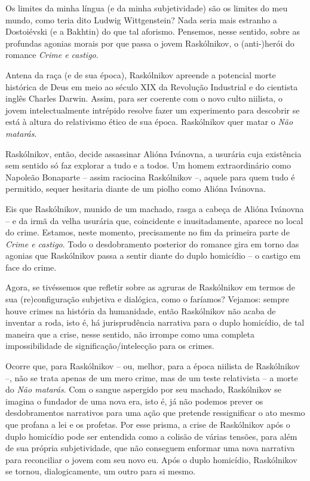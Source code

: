 Os limites da minha língua (e da minha subjetividade) são os limites do
meu mundo, como teria dito Ludwig Wittgenstein? Nada seria mais estranho
a Dostoiévski (e a Bakhtin) do que tal aforismo. Pensemos, nesse
sentido, sobre as profundas agonias morais por que passa o jovem
Raskólnikov, o (anti-)herói do romance \emph{Crime e castigo}.

Antena da raça (e de sua época), Raskólnikov apreende a potencial morte
histórica de Deus em meio ao século XIX da Revolução Industrial e do
cientista inglês Charles Darwin. Assim, para ser coerente com o novo
culto niilista, o jovem intelectualmente intrépido resolve fazer um
experimento para descobrir se está à altura do relativismo ético de sua
época. Raskólnikov quer matar o \emph{Não matarás}.

Raskólnikov, então, decide assassinar Alióna Ivánovna, a usurária cuja
existência sem sentido só faz explorar a tudo e a todos. Um homem
extraordinário como Napoleão Bonaparte -- assim raciocina Raskólnikov
--, aquele para quem tudo é permitido, sequer hesitaria diante de um
piolho como Alióna Ivánovna.

Eis que Raskólnikov, munido de um machado, rasga a cabeça de Alióna
Ivánovna -- e da irmã da velha usurária que, coincidente e
inusitadamente, aparece no local do crime. Estamos, neste momento,
precisamente no fim da primeira parte de \emph{Crime e castigo}. Todo o
desdobramento posterior do romance gira em torno das agonias que
Raskólnikov passa a sentir diante do duplo homicídio -- o castigo em
face do crime.

Agora, se tivéssemos que refletir sobre as agruras de Raskólnikov em
termos de sua (re)configuração subjetiva e dialógica, como o faríamos?
Vejamos: sempre houve crimes na história da humanidade, então
Raskólnikov não acaba de inventar a roda, isto é, há jurisprudência
narrativa para o duplo homicídio, de tal maneira que a crise, nesse
sentido, não irrompe como uma completa impossibilidade de
significação/intelecção para os crimes.

Ocorre que, para Raskólnikov -- ou, melhor, para a época niilista de
Raskólnikov --, não se trata apenas de um mero crime, mas de um teste
relativista -- a morte do \emph{Não matarás}. Com o sangue aspergido por
seu machado, Raskólnikov se imagina o fundador de uma nova era, isto é,
já não podemos prever os desdobramentos narrativos para uma ação que
pretende ressignificar o ato mesmo que profana a lei e os profetas. Por
esse prisma, a crise de Raskólnikov após o duplo homicídio pode ser
entendida como a colisão de várias tensões, para além de sua própria
subjetividade, que não conseguem enformar uma nova narrativa para
reconciliar o jovem com seu novo eu. Após o duplo homicídio, Raskólnikov
se tornou, dialogicamente, um outro para si mesmo.

